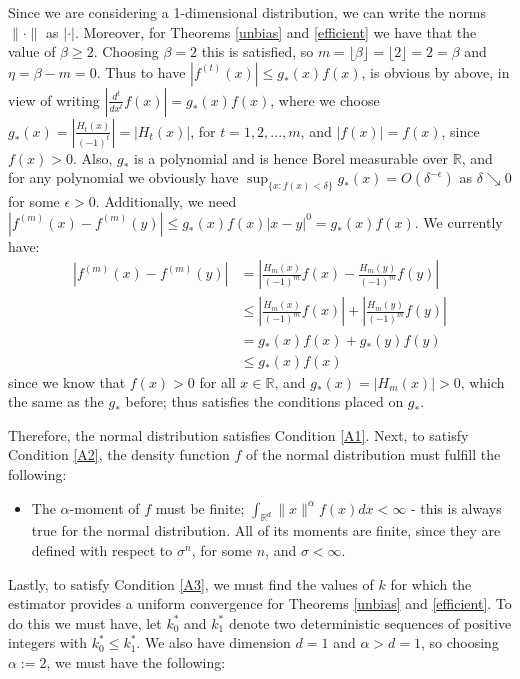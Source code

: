 \documentclass[12pt]{report}
\begin{document}
\begin{itemize}
Since we are considering a 1-dimensional distribution, we can write the norms $\| \cdotp \|$ as  $| \cdotp |$. Moreover, for Theorems \ref{unbias} and \ref{efficient} we have that the value of $\beta \geq 2$. Choosing $\beta = 2$ this is satisfied, so $m = \lfloor \beta \rfloor =  \lfloor 2 \rfloor = 2 = \beta$ and $\eta = \beta -m =0$. Thus to have $|f^{(t)}(x)| \leq g_{*}(x) f(x)$, is obvious by above, in view of writing $|\frac{d^t}{dx^t} f(x)| = g_{*}(x) f(x)$, where we choose $ g_{*}(x) = |\frac{H_{t}(x)}{(-1)^t}| = |H_{t}(x)|$, for $t=1,2,...,m$, and $|f(x)| = f(x)$, since $f(x) >0$. Also, $g_{*}$ is a polynomial and is hence Borel measurable over $\mathbb{R}$, and for any polynomial we obviously have $\sup_{\{x : f(x) < \delta\}} g_{*}(x) = O(\delta^{-\epsilon})$ as $\delta \searrow 0$ for some $\epsilon >0$. Additionally, we need $|f^{(m)}(x) - f^{(m)}(y)| \leq g_{*}(x) f(x)| x-y|^{0} = g_{*}(x) f(x)$. We currently have:
\begin{align*}
|f^{(m)}(x) - f^{(m)}(y)| &= \left| \frac{H_{m}(x)}{(-1)^m} f(x) - \frac{H_{m}(y)}{(-1)^m} f(y) \right| \\
&\leq \left| \frac{H_{m}(x)}{(-1)^m} f(x) \right| + \left| \frac{H_{m}(y)}{(-1)^m} f(y) \right| \\
&= g_{*}(x)f(x) + g_{*}(y)f(y) \\
&\leq g_{*}(x)f(x)
\end{align*}
since we know that $f(x) >0$ for all $x \in \mathbb{R}$, and $g_{*}(x) = |H_{m}(x)| >0$, which the same as the $g_{*}$ before; thus satisfies the conditions placed on $g_{*}$.
\end{itemize}

Therefore, the normal distribution satisfies Condition \ref{A1}. Next, to satisfy Condition \ref{A2}, the density function $f$ of the normal distribution must fulfill the following:
\begin{itemize}
\item The $\alpha$-moment of $f$ must be finite; $\int_{\mathbb{R}^{d}} \| x \|^{\alpha} f(x) dx < \infty$ - this is always true for the normal distribution. All of its moments are finite, since they are defined with respect to $\sigma^n$, for some $n$, and $\sigma < \infty$.

\end{itemize}

Lastly, to satisfy Condition \ref{A3}, we must find the values of $k$ for which the estimator provides a uniform convergence for Theorems \ref{unbias} and \ref{efficient}. To do this we must have, let $k_{0}^{*}$ and $k_{1}^{*}$ denote two deterministic sequences of positive integers with $k_{0}^{*} \leq k_{1}^{*}$. We also have dimension $d=1$ and $\alpha > d =1$, so choosing $\alpha := 2$, we must have the following:
\end{document}
